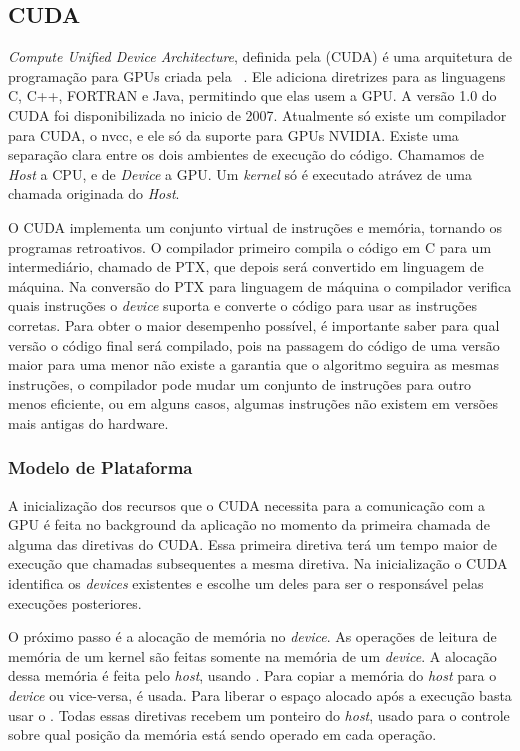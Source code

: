 \subsection{CUDA}
\textit{Compute Unified Device Architecture}, definida pela (CUDA) é uma arquitetura de programação para GPUs criada
pela ~\cite{nvidia2007compute}.
Ele adiciona diretrizes para as linguagens C, C++, FORTRAN e Java, permitindo que elas usem a GPU.
A versão 1.0 do CUDA foi disponibilizada no inicio de 2007. Atualmente só existe um compilador para CUDA, o nvcc,
e ele só da suporte para GPUs NVIDIA. Existe uma separação clara entre os dois
ambientes de execução do código. Chamamos de \textit{Host} a CPU, e de \textit{Device}
a GPU. Um \textit{kernel} só é executado atrávez de uma chamada originada do \textit{Host}.

O CUDA implementa um conjunto virtual de instruções e memória, tornando os programas retroativos. O compilador
primeiro compila o código em C para um intermediário, chamado de PTX, que depois será convertido em linguagem
de máquina. Na conversão do PTX para linguagem de máquina o compilador verifica quais instruções o \textit{device}
suporta e converte o código para usar as instruções corretas.
Para obter o maior desempenho possível, é importante saber para qual versão o código final será compilado,
pois na passagem do código de uma versão maior para uma menor não existe a garantia que o algoritmo seguira as mesmas instruções,
o compilador pode mudar um conjunto de instruções para outro menos eficiente, ou em alguns casos, algumas instruções não existem em
versões mais antigas do hardware.

\subsubsection{Modelo de Plataforma}
A inicialização dos recursos que o CUDA necessita para a comunicação com a GPU é feita no background da
aplicação no momento da primeira chamada de alguma das diretivas do CUDA. Essa primeira diretiva terá um
tempo maior de execução que chamadas subsequentes a mesma diretiva. Na inicialização o CUDA identifica
os \textit{devices} existentes e escolhe um deles para ser o responsável pelas execuções posteriores.

O próximo passo é a alocação de memória no \textit{device}. As operações de leitura de memória de um kernel são feitas somente
na memória de um \textit{device}. A alocação dessa memória é feita pelo \textit{host}, usando .
Para copiar a memória do \textit{host} para o \textit{device} ou vice-versa,
 é usada. Para liberar o espaço alocado após a execução basta usar o .
Todas essas diretivas recebem um ponteiro do \textit{host}, usado para o controle sobre qual posição da memória está sendo
operado em cada operação.

